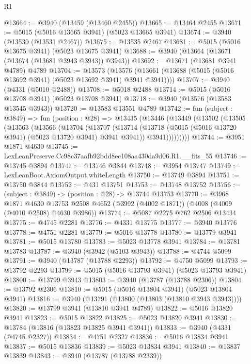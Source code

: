 \begin{lexlean}{R1}
\begin{coremodule}
@13664 := @3940 (@13459 (@13460 @2455))
@13665 := @13464 @2455
@13671 := @5015 (@5016 @13665 @3941) (@5023 @13665 @3941)
@13674 := @3940 (@13530 (@13531 @2467))
@13675 := @13535 @2467
@13681 := @5015 (@5016 @13675 @3941) (@5023 @13675 @3941)
@13688 := @3940 (@13664 (@13671 (@13674 (@13681 @3943 @3943)) @3943))
@13692 := @13671 (@13681 @3941 @4789) @4789
@13704 := @13573
    (@13576 (@13661 (@13688 (@5015 (@5016 @13692 @3941) (@5023 @13692 @3941) @3941 @3941))))
@13707 := @3940 (@4331 (@5010 @2488))
@13708 := @5018 @2488
@13714 := @5015 (@5016 @13708 @3941) (@5023 @13708 @3941)
@13718 := @3940 (@13576 (@13583 @13545 @3943))
@13720 := @13583 @13551 @4789
@13742 := fun (subject : @3849) =>
  fun (position : @28) =>
  @13435
    (@13446
      (@13449
        (@13502
          (@13505
            (@13563
              (@13566
                (@13704
                  (@13707
                    (@13714
                      (@13718 (@5015 (@5016 @13720 @3941) (@5023 @13720 @3941) @3941 @3941))
                      @3941)))))))))
@13744 := @3951 @1871 @4630
@13745 := LexLeanPreserve.Cc98c37aafb92bdd8ec108aa430da9d06.R1.__fits_55
@13746 := @13745 @3894
@13747 := @13746 @3844
@13748 := @3954 @13747
@13749 := LexLeanBoot.AxiomOutput.whiteLength
@13750 := @13749 @3894
@13751 := @13750 @3844
@13752 := @431 @13751
@13753 := @13748 @13752
@13756 := (subject : @3849) -> (position : @28) -> @13744 @13753
@13770 := @3968
    @1871
    @4630
    @13753
    @2508
    @4652
    (@3992 (@4002 @1871))
    (@4008 (@4009 (@4010 @2508) @4630 @3986))
@13774 := @5087 @2275 @762 @2506 @13434
@13775 := @4745 @2281
@13776 := @4331 @13775
@13777 := @3940 @13776
@13778 := @4751 @2281
@13779 := @5016 @13778
@13780 := @13779 @3941
@13781 := @5015 @13780
@13783 := @5023 @13778 @3941
@13784 := @13781 @13783
@13787 := @3940 (@3942 (@5103 @3943))
@13788 := @4744 @5099
@13791 := @3940 (@13787 (@13788 @2293))
@13792 := @4750 @5099
@13793 := @13792 @2293
@13799 := @5015 (@5016 @13793 @3941) (@5023 @13793 @3941)
@13800 := @13799 @3943
@13803 := @3940 (@13787 (@13788 @2306))
@13804 := @13792 @2306
@13810 := @5015 (@5016 @13804 @3941) (@5023 @13804 @3941)
@13816 := @3940 (@13791 (@13800 (@13803 (@13810 @3943 @3943))))
@13820 := @13799 @3941 (@13810 @3941 @4789)
@13822 := @5016 @13820 @3941
@13823 := @5015 @13822
@13825 := @5023 @13820 @3941
@13830 := @13784 (@13816 (@13823 @13825 @3941 @3941))
@13833 := @3940 (@4331 (@4745 @2327))
@13834 := @4751 @2327
@13836 := @5016 @13834 @3941
@13837 := @5015 @13836
@13839 := @5023 @13834 @3941
@13840 := @13837 @13839
@13843 := @3940 (@13787 (@13788 @2339))

\end{coremodule}
\end{lexlean}
